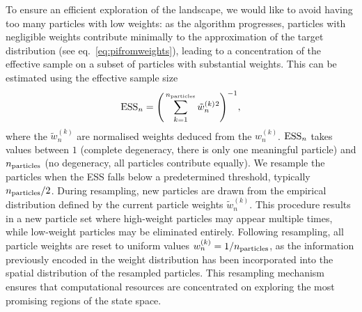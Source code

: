 \documentclass[11pt,a4paper]{article}
\begin{document}
	To ensure an efficient exploration of the landscape, we would like to avoid having too many particles with low weights: as the algorithm progresses, particles with negligible weights contribute minimally to the approximation of the target distribution (see eq.~\eqref{eq:pifromweights}), leading to a concentration of the effective sample on a subset of particles with substantial weights. This can be estimated using the effective sample size~\cite{ca54d442-d5bd-32ea-a920-38aa7d8a4043}
	\begin{equation}
		{\rm ESS}_{n} = \Bigg(\sum_{k=1}^{n_{\rm particles}} \tilde{w}^{(k)}_{n}{}^{2}\Bigg)^{-1},
	\end{equation}
	where the $\tilde{w}^{(k)}_{n}$ are normalised weights deduced from the $w^{(k)}_{n}$. ${\rm ESS}_{n}$ takes values between $1$ (complete degeneracy, there is only one meaningful particle) and $n_{\rm particles}$ (no degeneracy, all particles contribute equally). We resample the particles when the ESS falls below a predetermined threshold, typically $n_{\rm particles}/2$. During resampling, new particles are drawn from the empirical distribution defined by the current particle weights $\tilde{w}^{(k)}_{n}$.	This procedure results in a new particle set where high-weight particles may appear multiple times, while low-weight particles may be eliminated entirely. Following resampling, all particle weights are reset to uniform values $w_{n}^{(k)} = 1/n_{\rm particles}$, as the information previously encoded in the weight distribution has been incorporated into the spatial distribution of the resampled particles. This resampling mechanism ensures that computational resources are concentrated on exploring the most promising regions of the state space.
\end{document}
